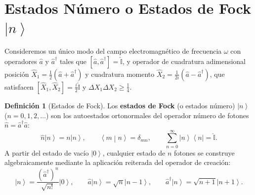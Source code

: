 \documentclass[11pt,a4paper,twoside]{report}
\theoremstyle{definition}
\newtheorem{definicion}{Definición}[chapter]
\theoremstyle{plain}
\theoremstyle{remark}
\newcommand{\ket}[1]{\left| #1 \right\rangle}
\newcommand{\braket}[2]{\left\langle #1 \middle| #2 \right\rangle}
\newcommand{\ketbra}[2]{\left| #1 \right\rangle\!\left\langle #2 \right|}
\newcommand{\comm}[2]{\left[ #1, #2 \right]}
\newcommand{\op}[1]{\hat{#1}}
\newcommand{\ident}{\hat{\mathbb{I}}}
\begin{document}
\section{\texorpdfstring{Estados Número o Estados de Fock $\ket{n}$}{Estados Número o Estados de Fock (n)}}

Consideremos un único modo del campo electromagnético de frecuencia $\omega$ con operadores $\op{a}$ y $\op{a}^\dagger$ tales que $\comm{\op{a}}{\op{a}^\dagger} = \ident$, y operador de cuadratura adimensional posición $\op{X}_1 = \frac{1}{2}(\op{a} + \op{a}^\dagger)$ y cuadratura momento $\op{X}_2 = \frac{1}{2i}(\op{a} - \op{a}^\dagger)$, que satisfacen $\comm{\op{X}_1}{\op{X}_2} = \frac{i}{2}\ident$ y $\Delta X_1 \Delta X_2 \ge \frac{1}{4}$.

\begin{definicion}[Estados de Fock]
Los \textbf{estados de Fock} (o estados número) $\ket{n}$ ($n = 0, 1, 2, \dots$) son los autoestados ortonormales del operador número de fotones $\op{n} = \op{a}^\dagger \op{a}$:
\begin{equation}
    \op{n}\ket{n} = n\ket{n}, \qquad \braket{m}{n} = \delta_{mn}, \qquad \sum_{n=0}^{\infty} \ketbra{n}{n} = \ident.
\end{equation}
A partir del estado de vacío $\ket{0}$, cualquier estado de $n$ fotones se construye algebraicamente mediante la aplicación reiterada del operador de creación:
\begin{equation}
    \ket{n} = \frac{(\op{a}^\dagger)^n}{\sqrt{n!}}\ket{0}, \qquad \op{a}\ket{n} = \sqrt{n}\ket{n-1}, \qquad \op{a}^\dagger\ket{n} = \sqrt{n+1}\ket{n+1}.
\end{equation}
\end{definicion}
\end{document}
